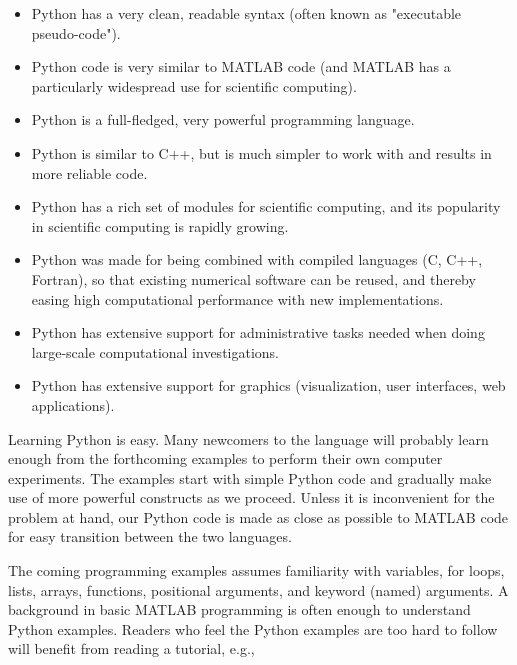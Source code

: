 \documentclass[graybox,sectrefs,envcountresetchap,open=right,final]{svmonodo}
\begin{document}
\begin{itemize}
  \item Python has a very clean, readable syntax (often known as "executable pseudo-code").

  \item Python code is very similar to MATLAB code (and MATLAB has a particularly widespread use for scientific computing).

  \item Python is a full-fledged, very powerful programming language.

  \item Python is similar to C++, but is much simpler to work with and results in more reliable code.

  \item Python has a rich set of modules for scientific computing, and its popularity in scientific computing is rapidly growing.

  \item Python was made for being combined with compiled languages (C, C++, Fortran), so that existing numerical software can be reused, and thereby easing high computational performance with new implementations.

  \item Python has extensive support for administrative tasks needed when doing large-scale computational investigations.

  \item Python has extensive support for graphics (visualization, user interfaces, web applications).
\end{itemize}

\noindent
Learning Python is easy. Many newcomers to the language will probably
learn enough from the forthcoming examples to perform their own computer
experiments. The examples start with simple Python code and gradually
make use of more powerful constructs as we proceed. Unless it is
inconvenient for the problem at hand, our Python code is made as
close as possible to MATLAB code for easy transition between the two
languages.

The coming programming examples assumes familiarity with
variables, for loops, lists, arrays,
functions, positional arguments, and keyword (named) arguments.
A background in basic MATLAB programming is often enough to understand
Python examples.
Readers who feel the Python examples are too hard to follow will
benefit from reading a tutorial, e.g.,
\end{document}
